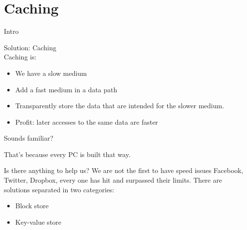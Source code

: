 \section{Caching}

\begin{frame}{Intro}

	Solution: Caching\\
	\spc
	Caching is:
	\begin{itemize}
		\item We have a slow medium
		\item Add a fast medium in a data path
		\item Transparently store the data that are intended for the 
			slower medium.
		\item Profit: later accesses to the same data are faster
	\end{itemize}
	\dspc
	Sounds familiar?
\end{frame}

\begin{frame}
	
	That's because every PC is built that way.
\end{frame}

\begin{frame}
	Is there anything to help us?
	\dspc
	We are not the first to have speed issues
	\dspc
	Facebook, Twitter, Dropbox, every one has hit and surpassed their 
	limits.
	\dspc
	There are solutions separated in two categories:
	\begin{itemize}
		\item Block store
		\item Key-value store
	\end{itemize}
\end{frame}


